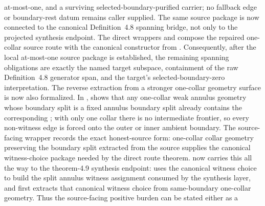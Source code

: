 \documentclass[11pt]{article}
\begin{document}
at-most-one, and a surviving selected-boundary-purified carrier; no fallback
edge or boundary-rest datum remains caller supplied.
The same source package is now connected to the canonical Definition~4.8
spanning bridge, not only to the projected synthesis endpoint.  The direct
wrappers
and
compose the repaired one-collar source route with the canonical
 constructor from
.  Consequently, after the local
at-most-one source package is established, the remaining spanning obligations
are exactly the named target subspace, containment of the raw Definition~4.8
generator span, and the target's selected-boundary-zero interpretation.
The reverse extraction from a stronger one-collar geometry surface is now also
formalized.  In ,
shows that any one-collar weak annulus geometry whose boundary split is a fixed
annulus boundary split already contains the corresponding
; with only one collar there is no
intermediate frontier, so every non-witness edge is forced onto the outer or
inner ambient boundary.  The source-facing wrapper
records the exact honest-source form: one-collar collar geometry preserving the
boundary split extracted from the source supplies the canonical witness-choice
package needed by the direct route theorem.
 now carries this all the way
to the theorem-4.9 synthesis endpoint:
uses the canonical witness choice to build the split annulus witness assignment
consumed by the synthesis layer, and
first extracts that canonical witness choice from same-boundary one-collar
geometry.  Thus the source-facing positive burden can be stated either as a
\end{document}
